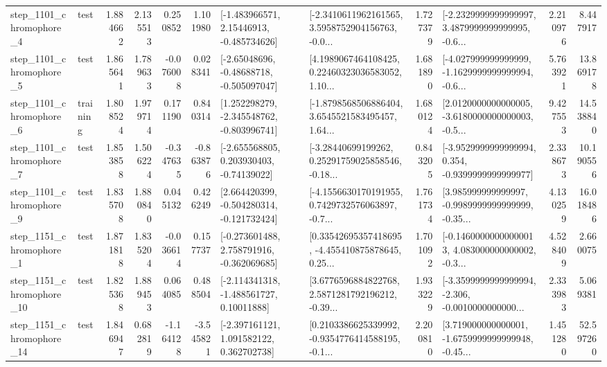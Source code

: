 \begin{tabular}{llrrrrllrlrr}
  step\_1101\_chromophore\_4 &      test &      1.884662 &    2.135513 &      0.250852 &  1.101980 &    [-1.483966571, 2.15446913, -0.485734626] &  [-2.3410611962161565, 3.5958752904156763, -0.0... &       1.727379 &  [-2.2329999999999997, 3.4879999999999995, -0.6... &            2.210976 &          8.447917 \\
  step\_1101\_chromophore\_5 &      test &      1.865641 &    1.789633 &     -0.076008 &  0.028341 &    [-2.65048696, -0.48688718, -0.505097047] &  [4.1989067464108425, 0.22460323036583052, 1.10... &       1.681890 &  [-4.027999999999999, -1.1629999999999994, -0.6... &            5.763921 &         13.869178 \\
  step\_1101\_chromophore\_6 &  training &      1.808524 &    1.979714 &      0.171190 &  0.840314 &   [1.252298279, -2.345548762, -0.803996741] &  [-1.8798568506886404, 3.6545521583495457, 1.64... &       1.680124 &  [2.0120000000000005, -3.6180000000000003, -0.5... &            9.427553 &         14.538840 \\
  step\_1101\_chromophore\_7 &      test &      1.853858 &    1.506224 &     -0.347635 & -0.863876 &    [-2.655568805, 0.203930403, -0.74139022] &  [-3.28440699199262, 0.25291759025858546, -0.18... &       0.843205 &  [-3.9529999999999994, 0.354, -0.9399999999999977] &            2.338673 &         10.190556 \\
  step\_1101\_chromophore\_9 &      test &      1.835708 &    1.880840 &      0.045132 &  0.426249 &   [2.664420399, -0.504280314, -0.121732424] &  [-4.1556630170191955, 0.7429732576063897, -0.7... &       1.761734 &  [3.985999999999997, -0.9989999999999999, -0.35... &            4.130259 &         16.018486 \\
  step\_1151\_chromophore\_1 &      test &      1.871818 &    1.835204 &     -0.036614 &  0.157737 &   [-0.273601488, 2.758791916, -0.362069685] &  [0.33542695357418695, -4.455410875878645, 0.25... &       1.701092 &  [-0.14600000000000013, 4.083000000000002, -0.3... &            4.528409 &          2.660075 \\
 step\_1151\_chromophore\_10 &      test &      1.825368 &    1.889453 &      0.064085 &  0.488504 &    [-2.114341318, -1.488561727, 0.10011888] &  [3.6776596884822768, 2.5871281792196212, -0.39... &       1.933229 &  [-3.3599999999999994, -2.306, -0.0010000000000... &            2.333983 &          5.069381 \\
 step\_1151\_chromophore\_14 &      test &      1.846947 &    0.682819 &     -1.164128 & -3.545821 &    [-2.397161121, 1.091582122, 0.362702738] &  [0.2103386625339992, -0.9354776414588195, -0.1... &       2.200810 &  [3.719000000000001, -1.6759999999999948, -0.45... &            1.451280 &         52.597260 \\

\end{tabular}
